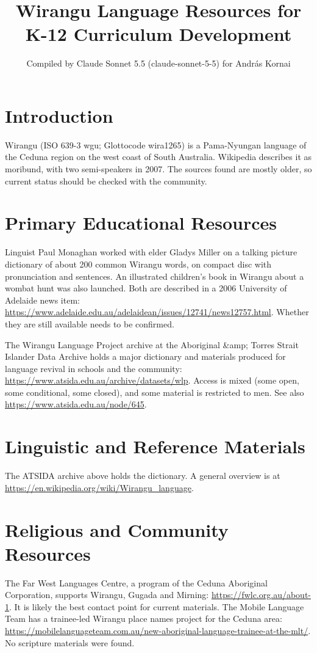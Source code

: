\documentclass[12pt]{article}
\title{Wirangu Language Resources for K-12 Curriculum Development}
\author{Compiled by Claude Sonnet 5.5 (claude-sonnet-5-5) for Andr\'as Kornai}
\date{}
\begin{document}
\maketitle

\section{Introduction}
Wirangu (ISO 639-3 wgu; Glottocode wira1265) is a Pama-Nyungan language of the Ceduna region on the west coast of South Australia. Wikipedia describes it as moribund, with two semi-speakers in 2007. The sources found are mostly older, so current status should be checked with the community.

\section{Primary Educational Resources}
Linguist Paul Monaghan worked with elder Gladys Miller on a talking picture dictionary of about 200 common Wirangu words, on compact disc with pronunciation and sentences. An illustrated children's book in Wirangu about a wombat hunt was also launched. Both are described in a 2006 University of Adelaide news item: \url{https://www.adelaide.edu.au/adelaidean/issues/12741/news12757.html}. Whether they are still available needs to be confirmed.

The Wirangu Language Project archive at the Aboriginal \&amp; Torres Strait Islander Data Archive holds a major dictionary and materials produced for language revival in schools and the community: \url{https://www.atsida.edu.au/archive/datasets/wlp}. Access is mixed (some open, some conditional, some closed), and some material is restricted to men. See also \url{https://www.atsida.edu.au/node/645}.

\section{Linguistic and Reference Materials}
The ATSIDA archive above holds the dictionary. A general overview is at \url{https://en.wikipedia.org/wiki/Wirangu_language}.

\section{Religious and Community Resources}
The Far West Languages Centre, a program of the Ceduna Aboriginal Corporation, supports Wirangu, Gugada and Mirning: \url{https://fwlc.org.au/about-1}. It is likely the best contact point for current materials. The Mobile Language Team has a trainee-led Wirangu place names project for the Ceduna area: \url{https://mobilelanguageteam.com.au/new-aboriginal-language-trainee-at-the-mlt/}. No scripture materials were found.
\end{document}
